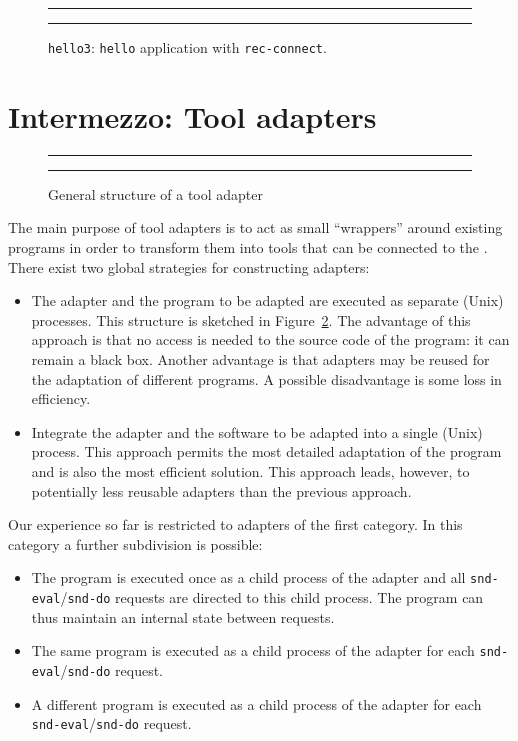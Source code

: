 \documentclass[a4,twoside,noweb]{article} %
\begin{document}
\begin{figure}[tb]
\rule{\textwidth}{0.5mm}

  \caption{{\tt hello3}: {\tt hello} application with {\tt rec-connect}.}
  \label{fig:hello3.tb}
\rule{\textwidth}{0.5mm}
\end{figure}

\section{Intermezzo: Tool adapters}
\begin{figure}[t]
\rule{\textwidth}{0.5mm}
  
  \centerline{\box\graph}
  \caption{General structure of a tool adapter}
  \label{fig:adapter}
\rule{\textwidth}{0.5mm}
\end{figure}

The main purpose of tool adapters is to act as small ``wrappers'' around
existing programs in order to transform them into tools that
can be connected to the \TB. There exist two global strategies
for constructing adapters:

\begin{itemize}
\item The adapter and the program to be adapted are executed as separate
(Unix) processes. This structure is sketched in Figure~\ref{fig:adapter}.
The advantage of this approach is that no access is
needed to the source code of the program: it can remain a black box.
Another advantage is that adapters may be reused for the adaptation of
different programs. A possible disadvantage is some loss in
efficiency.

\item Integrate the adapter and the software to be adapted into a single
(Unix) process. This approach permits the most detailed adaptation of
the program and is also the most efficient solution. This approach
leads, however, to potentially less reusable adapters than the
previous approach.

\end{itemize}

Our experience so far is restricted to adapters of the first category.
In this category a further subdivision is possible:
\begin{itemize}
\item The program is executed once as a child process of the adapter
and all {\tt snd-eval}/{\tt snd-do} requests are directed to this child process.
The program can thus maintain an internal state between requests.

\item The same program is executed as a child process of the adapter
for each {\tt snd-eval}/{\tt snd-do} request.

\item A different program is executed as a child process of the adapter
for each {\tt snd-eval}/{\tt snd-do} request.

\end{itemize}
\end{document}
